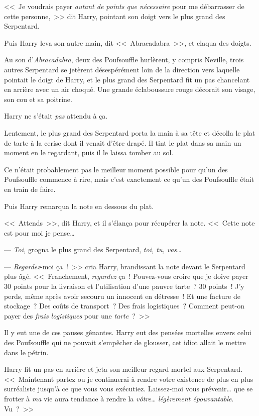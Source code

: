 <<~Je voudrais payer \emph{autant de points que nécessaire} pour me débarrasser de cette personne,~>> dit Harry, pointant son doigt vers le plus grand des Serpentard.

Puis Harry leva son autre main, dit <<~Abracadabra~>>, et claqua des doigts.

Au son d'\emph{Abracadabra}, deux des Poufsouffle hurlèrent, y compris Neville, trois autres Serpentard se jetèrent désespérément loin de la direction vers laquelle pointait le doigt de Harry, et le plus grand des Serpentard fit un pas chancelant en arrière avec un air choqué. Une grande éclaboussure rouge décorait son visage, son cou et sa poitrine.

Harry ne s'était \emph{pas} attendu à ça.

Lentement, le plus grand des Serpentard porta la main à sa tête et décolla le plat de tarte à la cerise dont il venait d'être drapé. Il tint le plat dans sa main un moment en le regardant, puis il le laissa tomber au sol.

Ce n'était probablement pas le meilleur moment possible pour qu'un des Poufsouffle commence à rire, mais c'est exactement ce qu'un des Poufsouffle était en train de faire.

Puis Harry remarqua la note en dessous du plat.

<<~Attends~>>, dit Harry, et il s'élança pour récupérer la note. <<~Cette note est pour moi je pense…

--- \emph{Toi,} grogna le plus grand des Serpentard, \emph{toi, tu, vas…}

--- \emph{Regardez}-moi ça~!~>> cria Harry, brandissant la note devant le Serpentard plus âgé. <<~Franchement, \emph{regardez} ça~! Pouvez-vous croire que je doive payer 30 points pour la livraison et l'utilisation d'une pauvre tarte~? 30 points~! J'y perds, même après avoir secouru un innocent en détresse~! Et une facture de stockage~? Des coûts de transport~? Des frais logistiques~? Comment peut-on payer des \emph{frais logistiques} pour une \emph{tarte}~?~>>

Il y eut une de ces pauses gênantes. Harry eut des pensées mortelles envers celui des Poufsouffle qui ne pouvait s'empêcher de glousser, cet idiot allait le mettre dans le pétrin.

Harry fit un pas en arrière et jeta son meilleur regard mortel aux Serpentard. <<~Maintenant partez ou je continuerai à rendre votre existence de plus en plus surréaliste jusqu'à ce que vous vous exécutiez. Laissez-moi vous prévenir… que se frotter à \emph{ma} vie aura tendance à rendre la \emph{vôtre}… \emph{légèrement épouvantable}. Vu~?~>>

